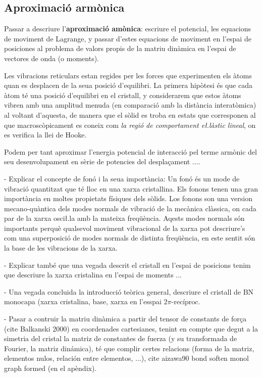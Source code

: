 \documentclass[12pt,twoside,a4paper]{article}%
\begin{document}
\subsection{Aproximació armònica}
Passar a descriure l'\textbf{aproximació amònica}: escriure el potencial, les equacions de moviment de Lagrange, y passar d'estes equacions de moviment en l'espai de posiciones al problema de valors propis de la matriu dinàmica en l'espai de vectores de onda (o moments).

Les vibracions reticulars estan regides per les forces que experimenten els àtoms quan es desplacen de la seua posició d'equilibri. La primera hipòtesi és que cada àtom té una posició d'equilibri en el cristall, y considerarem que estos àtoms vibren amb una amplitud menuda (en comparació amb la distància interatòmica) al voltant d'aquesta, de manera que el sòlid es troba en estats que corresponen al que macroscòpicament es coneix com \textit{la regió de comportament e\l.làstic lineal}, on es verifica la llei de Hooke.

Podem per tant aproximar l'energia potencial de interacció pel terme armònic del seu desenvolupament en sèrie de potencies del despla\c{c}ament ....


- Explicar el concepte de fonó i la seua importància: Un fonó és un mode de vibració quantitzat que té lloc en una xarxa cristallina. Els fonons tenen una gran importància en moltes propietats físiques dels sòlids. Los fonons son una version mecano-quàntica dels modes normals de vibració de la mecànica clàssica, on cada par de la xarxa osci\l.la amb la mateixa freqüència. Aqests modes normals són importants perquè qualsevol moviment vibracional de la xarxa pot descriure's com una superposició de modes normals de distinta freqüència, en este sentit són la base de les vibracions de la xarxa.

- Explicar també que una vegada descrit el cristall en l'espai de posicions tenim que descriure la xarxa cristalina en l'espai de moments ...

- Una vegada concluida la introducció teòrica general, descriure el cristall de BN monocapa (xarxa cristalina, base, xarxa en l'esspai $2\pi\text{-recíproc}$.

- Pasar a contruir la matriu dinàmica a partir del tensor de constants de for\c{c}a (cite Balkanski 2000) en coordenades cartesianes, tenint en compte que degut a la simetria del cristal la matriz de constantes de fuerza (y su transformada de Fourier, la matriz dinámica), té que complir certes relacions (forma de la matriz, elementos nulos, relación entre elementos, ...), cite aizawa90 bond soften monol graph formed (en el apèndix). 
\end{document}
